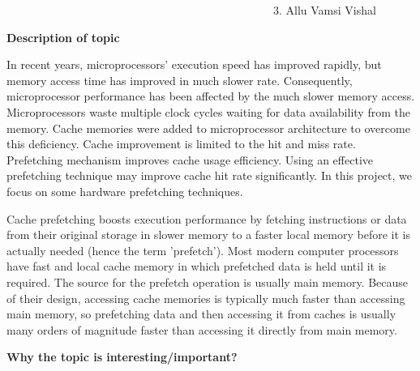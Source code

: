 \documentclass[12pt]{article}
\begin{document}
{\fontsize{15pt}{18.0pt}\selectfont \ \ \ \ \ \ \ \ \ \ \ \ \ \ \ \ \ \ \ \ \ \ \ \ \ \ \ \ \ \ \ \ \ \ \ \ \ \ \ \ \ \ \ \ \ \ \  3. Allu Vamsi Vishal\par}\par


\vspace{\baselineskip}
{\fontsize{20pt}{24.0pt}\selectfont \textbf{Description of topic}\par}\par


\vspace{\baselineskip}
{\fontsize{15pt}{18.0pt}\selectfont In recent years, microprocessors’ execution speed has improved rapidly, but memory access time has improved in much slower rate. Consequently, microprocessor performance has been affected by the much slower memory access. Microprocessors waste multiple clock cycles waiting for data availability from the memory. Cache memories were added to microprocessor architecture to overcome this deficiency. Cache improvement is limited to the hit and miss rate. Prefetching mechanism improves cache usage efficiency. Using an effective prefetching technique may improve cache hit rate significantly. In this project, we focus on some hardware prefetching techniques.\par}\par


\vspace{\baselineskip}
{\fontsize{15pt}{18.0pt}\selectfont \textcolor[HTML]{222222}{Cache prefetching boosts execution performance by fetching instructions or data from their original storage in slower memory to a faster local memory before it is actually needed (hence the term 'prefetch'). Most modern computer processors have fast and local cache memory in which prefetched data is held until it is required. The source for the prefetch operation is usually main memory. Because of their design, accessing cache memories is typically much faster than accessing main memory, so prefetching data and then accessing it from caches is usually many orders of magnitude faster than accessing it directly from main memory.}\par}\par


\vspace{\baselineskip}
{\fontsize{20pt}{24.0pt}\selectfont \textbf{\textcolor[HTML]{222222}{Why the topic is interesting/important?}}\par}\par
\end{document}
